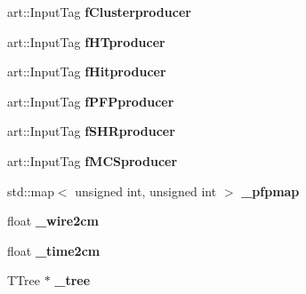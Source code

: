 \begin{DoxyCompactItemize}
\item 
art\+::\+Input\+Tag {\bfseries f\+Clusterproducer}\hypertarget{classSecondShowerPurity_a641801003f7a8cab0bb13efc21583739}{}\label{classSecondShowerPurity_a641801003f7a8cab0bb13efc21583739}

\item 
art\+::\+Input\+Tag {\bfseries f\+H\+Tproducer}\hypertarget{classSecondShowerPurity_aac4bc55cedfa1905dfb2c60197198007}{}\label{classSecondShowerPurity_aac4bc55cedfa1905dfb2c60197198007}

\item 
art\+::\+Input\+Tag {\bfseries f\+Hitproducer}\hypertarget{classSecondShowerPurity_a397ee926f1a3b5594fde75933b30b48b}{}\label{classSecondShowerPurity_a397ee926f1a3b5594fde75933b30b48b}

\item 
art\+::\+Input\+Tag {\bfseries f\+P\+F\+Pproducer}\hypertarget{classSecondShowerPurity_ab3ba769b6c15e325813bad206a7a2223}{}\label{classSecondShowerPurity_ab3ba769b6c15e325813bad206a7a2223}

\item 
art\+::\+Input\+Tag {\bfseries f\+S\+H\+Rproducer}\hypertarget{classSecondShowerPurity_af3cade2862986deb0c2333f7a13208ea}{}\label{classSecondShowerPurity_af3cade2862986deb0c2333f7a13208ea}

\item 
art\+::\+Input\+Tag {\bfseries f\+M\+C\+Sproducer}\hypertarget{classSecondShowerPurity_a267de14095ad791afcca1f3f2a568a87}{}\label{classSecondShowerPurity_a267de14095ad791afcca1f3f2a568a87}

\item 
std\+::map$<$ unsigned int, unsigned int $>$ {\bfseries \+\_\+pfpmap}\hypertarget{classSecondShowerPurity_af8a380f40bb05c2cb9b63ed3cfd9aa0f}{}\label{classSecondShowerPurity_af8a380f40bb05c2cb9b63ed3cfd9aa0f}

\item 
float {\bfseries \+\_\+wire2cm}\hypertarget{classSecondShowerPurity_a99010c0c89592e3dd9f696f490a1a7f7}{}\label{classSecondShowerPurity_a99010c0c89592e3dd9f696f490a1a7f7}

\item 
float {\bfseries \+\_\+time2cm}\hypertarget{classSecondShowerPurity_ac3c7bec25a10542beb5f12e1f3fc03b2}{}\label{classSecondShowerPurity_ac3c7bec25a10542beb5f12e1f3fc03b2}

\item 
T\+Tree $\ast$ {\bfseries \+\_\+tree}\hypertarget{classSecondShowerPurity_acc6a1cb74b439825c0c3e116e7e79990}{}\label{classSecondShowerPurity_acc6a1cb74b439825c0c3e116e7e79990}


\end{DoxyCompactItemize}

